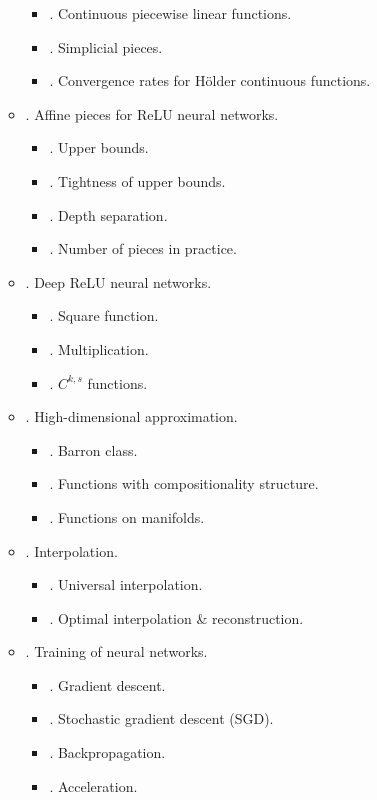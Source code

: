 \documentclass{article}
\begin{document}
\begin{enumerate}
\begin{itemize}
\begin{itemize}
			\item {. Continuous piecewise linear functions.}
			\item {. Simplicial pieces.}
			\item {. Convergence rates for H\"older continuous functions.}
		\end{itemize}
		\item {. Affine pieces for ReLU neural networks.}
		\begin{itemize}
			\item {. Upper bounds.}
			\item {. Tightness of upper bounds.}
			\item {. Depth separation.}
			\item {. Number of pieces in practice.}
		\end{itemize}
		\item {. Deep ReLU neural networks.}
		\begin{itemize}
			\item {. Square function.}
			\item {. Multiplication.}
			\item {. $C^{k,s}$ functions.}
		\end{itemize}
		\item {. High-dimensional approximation.}
		\begin{itemize}
			\item {. Barron class.}
			\item {. Functions with compositionality structure.}
			\item {. Functions on manifolds.}
		\end{itemize}
		\item {. Interpolation.}
		\begin{itemize}
			\item {. Universal interpolation.}
			\item {. Optimal interpolation \& reconstruction.}
		\end{itemize}
		\item {. Training of neural networks.}
		\begin{itemize}
			\item {. Gradient descent.}
			\item {. Stochastic gradient descent (SGD).}
			\item {. Backpropagation.}
			\item {. Acceleration.}

\end{itemize}
\end{itemize}
\end{enumerate}
\end{document}
